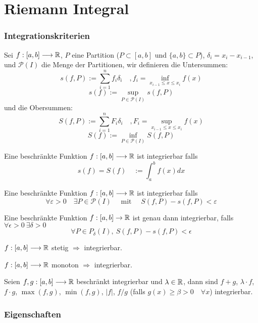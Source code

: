 \part{Riemann Integral}
\setcounter{section}{0}


\section{Integrationskriterien}

\Def Sei $f : [a,b] \longrightarrow \mathbb{R}$, $P$ eine Partition ($P \subset [a,b]$ und $\{a,b\} \subset P$), $\delta_{i} = x_i-x_{i-1}$,
und $\mathcal{P}(I)$ die Menge der Partitionen, wir definieren die Untersummen:
$$s(f, P):=\sum_{i=1}^{n} f_{i} \delta_{i} \quad, f_i = \inf_{x_{i-1}\leq x \leq x_i} f(x)$$
$$s(f):=\sup_{P \in \mathcal{P}(I)} s(f, P)$$
und die Obersummen:
$$S(f, P):=\sum_{i=1}^{n} F_{i} \delta_{i} \quad, F_i = \sup_{x_{i-1}\leq x \leq x_i} f(x)$$
$$S(f):=\inf_{P \in \mathcal{P}(I)} S(f, P)$$

\Def Eine beschränkte Funktion $f : [a,b] \longrightarrow \mathbb{R}$ ist integrierbar falls
$$s(f) = S(f) \quad := \int_{a}^{b} f(x) dx$$

\Satz Eine beschränkte Funktion $f : [a,b] \longrightarrow \mathbb{R}$ ist integrierbar falls
$$\forall \varepsilon>0 \quad \exists P \in \mathcal{P}(I) \quad \text { mit } \quad S(f, P)-s(f, P)<\varepsilon$$

\Satz Eine beschränkte Funktion $f: [a, b] \rightarrow \mathbb{R}$ ist genau dann integrierbar, falls $\forall \epsilon > 0 \ \exists \delta > 0$
\[ \forall P \in P_\delta (I), \ S(f, P) - s(f, P) < \epsilon \]

\Satz $f : [a,b] \longrightarrow \mathbb{R}$  stetig $\Rightarrow$ integrierbar.

\Satz $f : [a,b] \longrightarrow \mathbb{R}$  monoton $\Rightarrow$ integrierbar.

\Satz Seien $f,g : [a,b] \longrightarrow \mathbb{R}$ beschränkt integrierbar und $\lambda \in \mathbb{R}$, dann sind $f+g$, $\lambda \cdot f$, $f \cdot g$, 
$\max (f,g)$, $\min (f,g)$, $|f|$,  $f / g$ (falls $g(x) \geq \beta > 0 \quad \forall x$) integrierbar.


\section{Eigenschaften}


